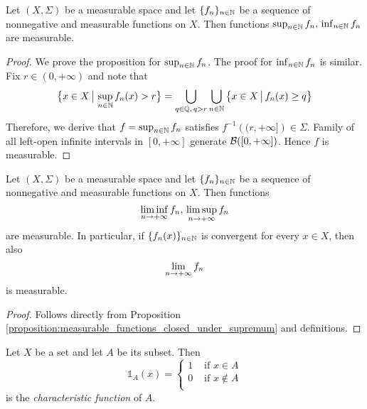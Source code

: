 \documentclass[10pt]{amsart}
\begin{document}
\begin{proposition}\label{proposition:measurable_functions_closed_under_supremum}
	Let $(X,\Sigma)$ be a measurable space and let $\{f_n\}_{n\in {\mathbb N}}$ be a sequence of nonnegative and measurable functions on $X$. Then functions $\sup_{n\in {\mathbb N}}f_n,\,\inf_{n\in {\mathbb N}}f_n$ are measurable.
\end{proposition}
\begin{proof}
	We prove the proposition for $\sup_{n\in {\mathbb N}}f_n$. The proof for $\inf_{n\in {\mathbb N}}f_n$ is similar. Fix $r \in (0,+\infty)$ and note that
	$$\big\{x\in X\,\big|\,\sup_{n\in {\mathbb N}}f_n(x) > r\big\} = \bigcup_{q\in {\mathbb Q},\,q > r}\bigcup_{n\in {\mathbb N}}\big\{x\in X\,\big|\,f_n(x) \geq q\big\}$$
	Therefore, we derive that $f = \sup_{n\in {\mathbb N}}f_n$ satisfies $f^{-1}\left((r,+
		\infty]\right)\in \Sigma$. Family of all left-open infinite intervals in $[0,+\infty]$ generate ${\mathcal B}([0,+\infty])$. Hence $f$ is measurable.
\end{proof}

\begin{corollary}\label{corollary:measurable_closed_under_limes_inferior}
	Let $(X,\Sigma)$ be a measurable space and let $\{f_n\}_{n\in {\mathbb N}}$ be a sequence of nonnegative and measurable functions on $X$. Then functions
	$$\liminf_{n \rightarrow +\infty}f_n,\,\limsup_{n\rightarrow +\infty}f_n$$
	are measurable. In particular, if $\{f_n(x)\}_{n\in {\mathbb N}}$ is convergent for every $x\in X$, then also $$\lim_{n\rightarrow +\infty}f_n$$
	is measurable.
\end{corollary}
\begin{proof}
	Follows directly from Proposition \ref{proposition:measurable_functions_closed_under_supremum} and definitions.
\end{proof}

\begin{definition}
	Let $X$ be a set and let $A$ be its subset. Then
	$$\mathbb{1}_A(x) = \begin{cases}
			1 & \mbox{ if }x \in A     \\
			0 & \mbox{ if }x\not \in A \\
		\end{cases}$$
	is the \textit{characteristic function} of $A$.
\end{definition}
\end{document}
